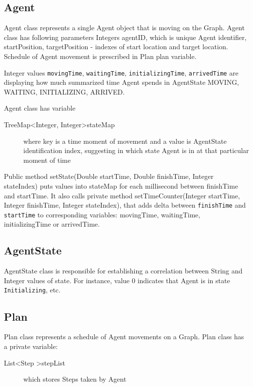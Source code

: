 \documentclass[thesis=B,english]{FITthesis}[2019/12/23]
\begin{document}
\subsection{Agent}
Agent class represents a single Agent object that is moving on the Graph. Agent class has following parameters Integers agentID, which is unique Agent identifier, startPosition, targetPosition - indexes of start location and target location. Schedule of Agent movement is prescribed in Plan plan variable.

Integer values \verb|movingTime|, \verb|waitingTime|, \verb|initializingTime|, \verb|arrivedTime| are displaying how much summarized time Agent spends in AgentState MOVING, WAITING, INITIALIZING, ARRIVED. 

Agent class has variable
\begin{description}
\item[TreeMap\textless Integer, Integer\textgreater stateMap] where key is  a time moment of movement and a value is AgentState identification index, suggesting in which state Agent is in at that particular moment of time
\end{description}

Public method setState(Double startTime, Double finishTime, Integer stateIndex) puts values into stateMap for each millisecond between finishTime and startTime. It also calls private method setTimeCounter(Integer startTime, Integer finishTime, Integer stateIndex), that adds delta between  \verb|finishTime| and \verb|startTime| to corresponding variables: movingTime, waitingTime, initializingTime or arrivedTime.

\subsection{AgentState}

AgentState class is responsible for establishing a correlation between String and Integer values of state. For instance, value 0 indicates that Agent is in state \verb|Initializing|, etc.

\subsection{Plan}
Plan class represents a schedule of Agent movements on a Graph. Plan class has a private variable:
\begin{description}
\item[List\textless Step \textgreater stepList] which stores Steps taken by Agent
\end{description}
\end{document}
